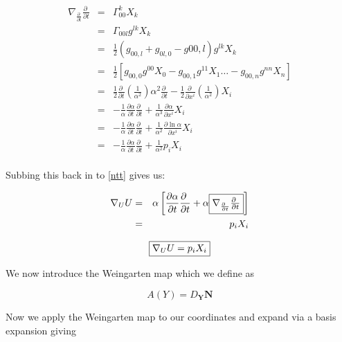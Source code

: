 \begin{eqnarray}
\nonumber
\nabla_{\frac{\partial \ }{\partial t}}{\frac{\partial \ }{\partial t}} &=& \Gamma_{00}^k X_k \\
\nonumber
&=& \Gamma_{00l}g^{lk}X_k \\
\nonumber
&=& \frac{1}{2}(g_{00,l}+g_{0l,0}-g{00,l})g^{lk}X_k \\
\nonumber
&=& \frac{1}{2} \left[g_{00,0}g^{00}X_0 - g_{00,1}g^{11} X_1 \ldots - g_{00,n}g^{nn} X_n \right] \\
\nonumber
&=& \frac{1}{2}\frac{\partial \ }{\partial t}\left(\frac{1}{\alpha^2}\right)\alpha^2\frac{\partial \ }{\partial t} - \frac{1}{2}  \frac{\partial \ }{\partial x^i}\left(\frac{1}{\alpha^2}\right)X_i \\
\nonumber
&=& -\frac{1}{\alpha}\frac{\partial \alpha}{\partial t}\frac{\partial \ }{\partial t} + \frac{1}{\alpha^3}\frac{\partial \alpha}{\partial x^i} X_i \\
\nonumber
&=& -\frac{1}{\alpha}\frac{\partial \alpha}{\partial t}\frac{\partial \ }{\partial t} + \frac{1}{\alpha^2}\frac{\partial \ln \alpha}{\partial x^i} X_i \\
\nonumber
&=& -\frac{1}{\alpha}\frac{\partial \alpha}{\partial t}\frac{\partial \ }{\partial t} + \frac{1}{\alpha^2} p_i X_i \\
\end{eqnarray}

Subbing this back in to \ref{ntt} gives us:

\begin{eqnarray}
\nonumber
\nabla_{U} U &=& \alpha \left[ \frac{\partial \alpha}{\partial t} \frac{\partial \ }{\partial t} + \alpha \mbox{\framebox{$\nabla_{\frac{\partial \ }{\partial t}}{\frac{\partial \ }{\partial t}}$}} \right ]  \\
\nonumber
&=& p_i X_i
\end{eqnarray}

\begin{equation}
\framebox{$\nabla_{U}U = p_i X_i$}
\label{nUU}
\end{equation}

We now introduce the Weingarten map which we define as

\begin{definition}
\begin{displaymath}
A(Y) = D_{\mathbf Y}\mathbf N
\end{displaymath}
\end{definition}

Now we apply the Weingarten map to our coordinates and expand via a basis expansion giving

